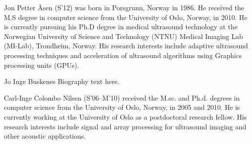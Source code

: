 \documentclass[journal]{IEEEtran}
\begin{document}
\begin{IEEEbiography}{Jon Petter \AA{}sen}
(S'12) was born in Porsgrunn, Norway in 1986. He received the M.S degree in computer science from the University of Oslo, Norway, in 2010. He is currently pursuing his Ph.D degree in medical ultrasound technology at the Norwegian University of Science and Technology (NTNU) Medical Imaging Lab (MI-Lab), Trondheim, Norway. His research interests include adaptive ultrasound processing techniques and acceleration of ultrasound algorithms using Graphics processing units (GPUs). 
\end{IEEEbiography}

\begin{IEEEbiography}{Jo Inge Buskenes}
Biography text here.
\end{IEEEbiography}

\begin{IEEEbiography}{Carl-Inge Colombo Nilsen}
(S’06–M’10) received the M.sc. and Ph.d. degrees in computer science from the University of Oslo, Norway, in 2005 and 2010. He is currently working at the University of Oslo as a postdoctoral research fellow. His research interests include signal and array processing for ultrasound imaging and other acoustic applications.
\end{IEEEbiography}
\end{document}
